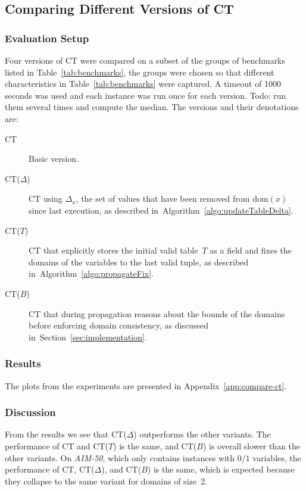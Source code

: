 \documentclass[a4paper,11pt]{article}
\newcommand{\Todo}[1]{{\color{blue}#1}}
\newcommand{\Secref}[1]{Section~\ref{#1}}
\newcommand{\Algoref}[1]{Algorithm~\ref{#1}}
\newcommand{\Dom}[1]{\text{dom}({#1})}
\numberwithin{equation}{section}
\begin{document}
\subsection{Comparing Different Versions of CT}
\label{sec:compare}

\subsubsection{Evaluation Setup}
Four versions of CT were compared on a subset of the groups of benchmarks
listed in Table~\ref{tab:benchmarks}, the groups were chosen so 
that different characteristics in Table~\ref{tab:benchmarks} were captured.
A timeout of 1000 seconds was
used and each instance was run once for each version.
\Todo{Todo: run them several times and compute the median.}
The versions and their denotations are:

\begin{description}
  \item[CT] Basic version.
  \item[CT($\Delta$)] CT using $\Delta_x$, the set
    of values that have been removed from $\Dom{x}$
    since last execution, as described in~\Algoref{algo:updateTableDelta}.
  \item[CT($T$)] CT that explicitly stores the initial valid table~$T$ as
    a field and
    fixes the domains of the variables to the last valid tuple, as described
    in~\Algoref{algo:propagateFix}.
  \item[CT($B$)] CT that during propagation reasons about the bounds of the domains before
    enforcing domain consistency, as discussed in~\Secref{sec:implementation}.
\end{description}

\subsubsection{Results}

The plots from the experiments are presented in Appendix~\ref{app:compare-ct}.

\subsubsection{Discussion}
From the results we see that CT($\Delta$) outperforms the other variants.
The performance of CT and CT($T$) is the same, and CT($B$) is overall
slower than the other variants. On \emph{AIM-50}, which only contains instances
with $0/1$ variables, the performance of CT, CT($\Delta$), and CT($B$) is
the same, which is expected because they collapse to the same variant
for domains of size~$2$.
\end{document}
